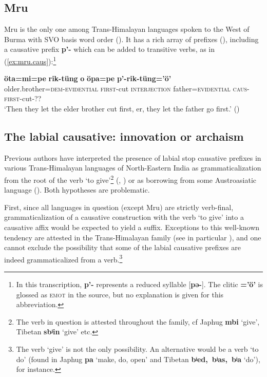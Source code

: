 \documentclass[oneside,a4paper,11pt]{article}
\newcommand{\ipa}[1]{\textbf{{\phon\mbox{#1}}}} %
\newcommand{\forme}[2]{\ipa{#1} `#2'}
\newcommand{\refb}[1]{(\ref{#1})}
\begin{document}
\subsection{Mru} \label{sec:mru}
Mru is the only one among Trans-Himalayan languages spoken to the West of Burma with SVO basis word order (\citealt{peterson05mru}). It has a rich array of prefixes (\citealt{williams08directionals}), including a causative prefix \ipa{p'-} which can be added to transitive verbs, as in \refb{ex:mru.caus}:\footnote{In this transcription, \ipa{p'-} represents a reduced syllable [\ipa{pə-}]. The clitic \ipa{=’ö’} is glossed as \textsc{emot} in the source, but no explanation is given for this abbreviation.}
 
\begin{exe}
\ex \label{ex:mru.caus}
\gll
\ipa{öta=mi=pe} \ipa{rik-tüng} \ipa{o} \ipa{öpa=pe} \ipa{p’-rik-tüng=’ö’} \\
older.brother=\textsc{dem-evidential} \textsc{first}-cut \textsc{interjection} father=\textsc{evidential} \textsc{caus-first}-cut-?? \\
\glt `Then they let the elder brother cut first, er, they let the father go first.' (\citealt[52]{williams08directionals})
\end{exe}
 
\subsection{The labial causative: innovation or archaism} \label{sec:innovation}
Previous authors have interpreted the presence of labial stop causative prefixes in various Trans-Himalayan languages of North-Eastern India as  grammaticalization from the root of the verb `to give'\footnote{The verb in question is attested throughout the family, cf Japhug \forme{mbi}{give}, Tibetan \forme{sbʲin}{give} etc.}
(\citealt[132]{matisoff03}, \citealt{jenny15give}) or as borrowing from some Austroasiatic language (\citealt{maspero46, diffloth08parallels, konnerth15cisloc, delancey15adjectival}). Both hypotheses are problematic. 

First, since all languages in question (except Mru) are strictly verb-final, grammaticalization of a causative construction with the verb `to give' into a causative affix would be expected to yield a suffix. Exceptions to this well-known tendency are attested in the Trans-Himalayan family (see in particular \citealt{jacques13harmonization}), and one cannot exclude the possibility that some of the labial causative prefixes are indeed grammaticalized from a verb.\footnote{The verb `give' is not the only possibility. An alternative would be a verb `to do' (found in Japhug \forme{pa}{make, do, open} and Tibetan \forme{bʲed, bʲas, bʲa}{do}), for instance.} 
\end{document}
